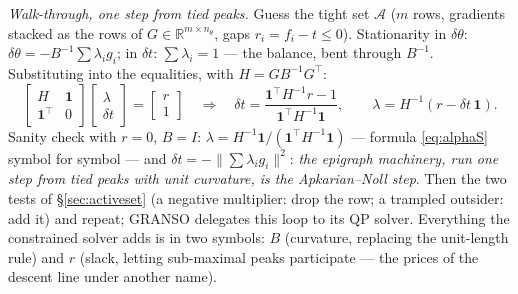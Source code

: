 \documentclass[11pt,a4paper]{article}
\newcommand{\R}{\mathbb{R}}
\newcommand{\T}{^{\!\top}}
\newcommand{\rev}[1]{#1}
\begin{document}
\emph{Walk-through, one step from tied peaks.}  Guess the tight set $\mathcal A$ ($m$
rows, \rev{gradients stacked as the rows of $G\in\R^{m\times n_\theta}$}, gaps $r_i=f_i-t\le0$).  Stationarity in $\delta\theta$:
$\delta\theta=-B^{-1}\sum\lambda_ig_i$; in $\delta t$: $\sum\lambda_i=1$ --- the balance,
bent through $B^{-1}$.  Substituting into the equalities, with $H=GB^{-1}G\T$:
\[
\begin{bmatrix}H&\mathbf 1\\ \mathbf 1\T&0\end{bmatrix}\begin{bmatrix}\lambda\\ \delta t\end{bmatrix}
=\begin{bmatrix}r\\ 1\end{bmatrix}
\quad\Longrightarrow\quad
\delta t=\frac{\mathbf 1\T H^{-1}r-1}{\mathbf 1\T H^{-1}\mathbf 1},\qquad
\lambda=H^{-1}(r-\delta t\,\mathbf 1).
\]
Sanity check with $r=0$, $B=I$: $\lambda=H^{-1}\mathbf 1/(\mathbf 1\T H^{-1}\mathbf 1)$ ---
formula \eqref{eq:alphaS} symbol for symbol --- and $\delta t=-\|\sum\lambda_ig_i\|^2$:
\emph{the epigraph machinery, run one step from tied peaks with unit curvature, is the
Apkarian--Noll step}.  Then the two tests of \S\ref{sec:activeset} (a negative multiplier:
drop the row; a trampled outsider: add it) and repeat; GRANSO delegates this loop to its
QP solver.  Everything the constrained solver adds is in two symbols: $B$ (curvature,
replacing the unit-length rule) and $r$ (slack, letting sub-maximal peaks participate ---
the prices of the descent line under another name).
\end{document}
